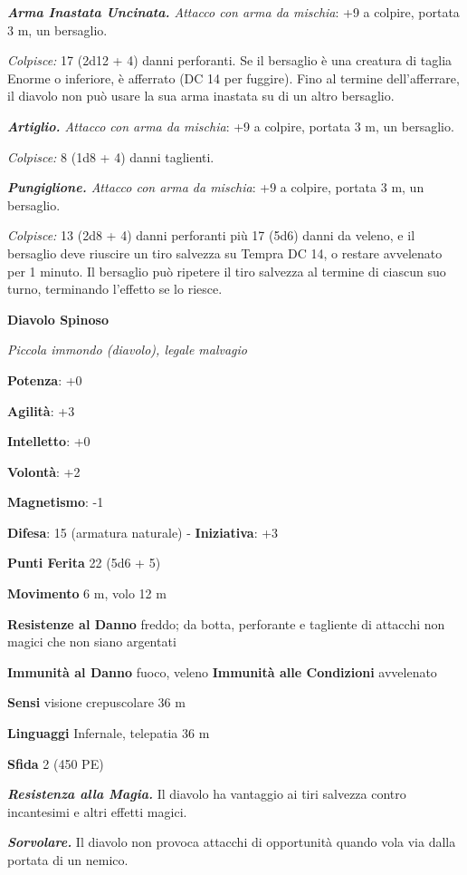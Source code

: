 \begin{multicols}{2}
\emph{\textbf{Arma Inastata Uncinata.} Attacco con arma da mischia}: +9
a colpire, portata 3 m, un bersaglio.

\emph{Colpisce:} 17 (2d12 + 4) danni perforanti. Se il bersaglio è una
creatura di taglia Enorme o inferiore, è afferrato (DC 14 per fuggire).
Fino al termine dell'afferrare, il diavolo non può usare la sua arma
inastata su di un altro bersaglio.

\emph{\textbf{Artiglio.} Attacco con arma da mischia}: +9 a colpire,
portata 3 m, un bersaglio.

\emph{Colpisce:} 8 (1d8 + 4) danni taglienti.

\emph{\textbf{Pungiglione.} Attacco con arma da mischia}: +9 a colpire,
portata 3 m, un bersaglio.

\emph{Colpisce:} 13 (2d8 + 4) danni perforanti più 17 (5d6) danni da
veleno, e il bersaglio deve riuscire un tiro salvezza su Tempra DC
14, o restare avvelenato per 1 minuto. Il bersaglio può ripetere il tiro
salvezza al termine di ciascun suo turno, terminando l'effetto se lo
riesce.

\textbf{Diavolo Spinoso}

\emph{Piccola immondo (diavolo), legale malvagio}

\textbf{Potenza}: +0

\textbf{Agilità}: +3

\textbf{Intelletto}: +0

\textbf{Volontà}: +2

\textbf{Magnetismo}: -1

\textbf{Difesa}: 15 (armatura naturale) - \textbf{Iniziativa}: +3

\textbf{Punti Ferita} 22 (5d6 + 5)

\textbf{Movimento} 6 m, volo 12 m

\textbf{Resistenze al Danno} freddo; da botta, perforante e tagliente
di attacchi non magici che non siano argentati

\textbf{Immunità al Danno} fuoco, veleno \textbf{Immunità alle
Condizioni} avvelenato

\textbf{Sensi} visione crepuscolare 36 m

\textbf{Linguaggi} Infernale, telepatia 36 m 

\textbf{Sfida} 2 (450 PE)\smallskip

\emph{\textbf{Resistenza alla Magia.}} Il diavolo ha vantaggio ai tiri
salvezza contro incantesimi e altri effetti magici.

\emph{\textbf{Sorvolare.}} Il diavolo non provoca attacchi di
opportunità quando vola via dalla portata di un nemico.


\end{multicols}
